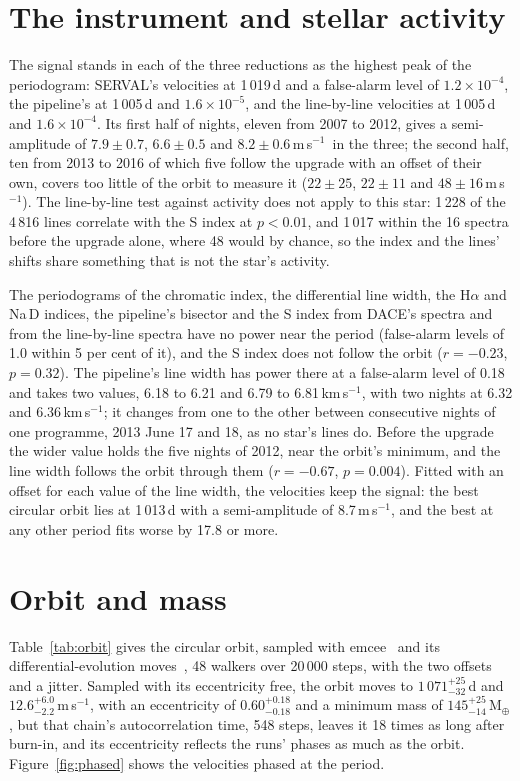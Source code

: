 \documentclass[3p,11pt]{elsarticle}
\newcommand{\kms}{km\,s$^{-1}$}
\newcommand{\ms}{m\,s$^{-1}$}
\newcommand{\Mearth}{M$_\oplus$}
\begin{document}
\section{The instrument and stellar activity}\label{sec:tests}

The signal stands in each of the three reductions as the highest peak of the periodogram: SERVAL's
velocities at 1\,019\,d and a false-alarm level of $1.2\times10^{-4}$, the pipeline's at 1\,005\,d and
$1.6\times10^{-5}$, and the line-by-line velocities at 1\,005\,d and $1.6\times10^{-4}$. Its first half
of nights, eleven from 2007 to 2012, gives a semi-amplitude of $7.9 \pm 0.7$, $6.6 \pm 0.5$ and
$8.2 \pm 0.6$\,\ms\ in the three; the second half, ten from 2013 to 2016 of which five follow the upgrade
with an offset of their own, covers too little of the orbit to measure it ($22 \pm 25$, $22 \pm 11$ and
$48 \pm 16$\,\ms). The line-by-line test against activity does not apply to this star: 1\,228 of the
4\,816 lines correlate with the S index at $p < 0.01$, and 1\,017 within the 16 spectra before the
upgrade alone, where 48 would by chance, so the index and the lines' shifts share something that is
not the star's activity.

The periodograms of the chromatic index, the differential line width, the H$\alpha$ and Na\,D indices,
the pipeline's bisector and the S index from DACE's spectra and from the line-by-line spectra have no
power near the period (false-alarm levels of 1.0 within 5 per cent of it), and the S index does not
follow the orbit ($r = -0.23$, $p = 0.32$). The pipeline's line width has power there at a false-alarm
level of 0.18 and takes two values, 6.18 to 6.21 and 6.79 to 6.81\,\kms, with two nights at 6.32 and
6.36\,\kms; it changes from one to the other between consecutive nights of one programme, 2013 June 17
and 18, as no star's lines do. Before the upgrade the wider value holds the five nights of 2012, near
the orbit's minimum, and the line width follows the orbit through them ($r = -0.67$, $p = 0.004$).
Fitted with an offset for each value of the line width, the velocities keep the signal: the best
circular orbit lies at 1\,013\,d with a semi-amplitude of 8.7\,\ms, and the best at any other period
fits worse by 17.8 or more.

\section{Orbit and mass}\label{sec:orbit}

Table~\ref{tab:orbit} gives the circular orbit, sampled with emcee~\cite{ForemanMackey2013} and its
differential-evolution moves~\cite{terBraak2006}, 48 walkers over 20\,000 steps, with the two offsets
and a jitter. Sampled with its eccentricity free, the orbit moves to $1\,071^{+25}_{-32}$\,d and
$12.6^{+6.0}_{-2.2}$\,\ms, with an eccentricity of $0.60^{+0.18}_{-0.18}$ and a minimum mass of
$145^{+25}_{-14}$\,\Mearth, but that chain's autocorrelation time, 548 steps, leaves it 18 times as long
after burn-in, and its eccentricity reflects the runs' phases as much as the orbit. Figure~\ref{fig:phased}
shows the velocities phased at the period.
\end{document}

